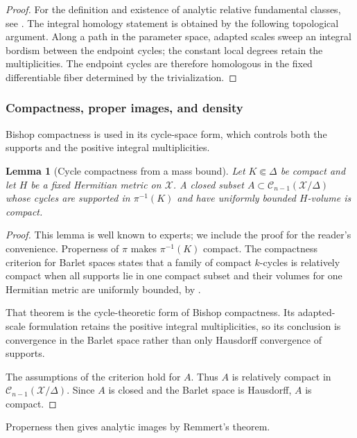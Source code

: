 \documentclass[11pt]{amsart}
\numberwithin{equation}{section}
\theoremstyle{plain}
\newtheorem{lemma}[thm]{Lemma}
\theoremstyle{definition}
\newcommand{\cC}{\mathcal C}
\newcommand{\cX}{\mathcal X}
\begin{document}
\begin{proof}
For the definition and existence of analytic relative fundamental classes,
see \cite[\S~2~B, Definition~1, and \S~2~D, Theorem~2]{Ba80}.
The integral homology statement is obtained by the
following topological argument.
Along a path in the parameter space, adapted scales sweep an integral bordism
between the endpoint cycles; the constant local degrees retain the
multiplicities.  The endpoint cycles are therefore homologous in the
fixed differentiable fiber determined by the trivialization.
\end{proof}

\subsubsection{Compactness, proper images, and density}
Bishop compactness is used in its cycle-space form, which controls both
the supports and the positive integral multiplicities.

\begin{lemma}[Cycle compactness from a mass bound]\label{lem:revised-bishop-cycle}
Let $K\Subset\Delta$ be compact and let $H$ be a fixed Hermitian metric on
$\cX$.  A closed subset $A\subset\cC_{n-1}(\cX/\Delta)$ whose cycles are
supported in $\pi^{-1}(K)$ and have uniformly bounded $H$-volume is
compact.
\end{lemma}

\begin{proof}
This lemma is well known to experts; we include the proof for the
reader's convenience.
Properness of $\pi$ makes $\pi^{-1}(K)$ compact.  The compactness criterion
for Barlet spaces states that a family of compact $k$-cycles is relatively
compact when all supports lie in one compact subset and their volumes for
one Hermitian metric are uniformly bounded, by
\cite[Theorem~4.2.72]{BM19}.

That theorem is the cycle-theoretic form of Bishop compactness.  Its
adapted-scale formulation retains the positive integral multiplicities,
so its conclusion is convergence in the Barlet space rather than only
Hausdorff convergence of supports.

The assumptions of the criterion hold for $A$.  Thus $A$ is relatively
compact in $\cC_{n-1}(\cX/\Delta)$.  Since $A$ is closed and the Barlet
space is Hausdorff, $A$ is compact.
\end{proof}

Properness then gives analytic images by Remmert's theorem.
\end{document}

